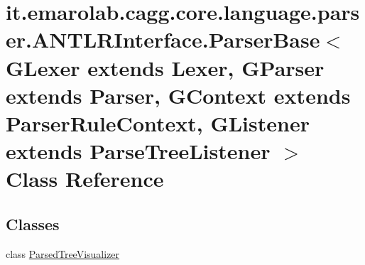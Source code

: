 \hypertarget{classit_1_1emarolab_1_1cagg_1_1core_1_1language_1_1parser_1_1ANTLRInterface_1_1ParserBase_3_01GL50c14717389f32c0d6ed45a3d8ee0386}{\section{it.\-emarolab.\-cagg.\-core.\-language.\-parser.\-A\-N\-T\-L\-R\-Interface.\-Parser\-Base$<$ G\-Lexer extends Lexer, G\-Parser extends Parser, G\-Context extends Parser\-Rule\-Context, G\-Listener extends Parse\-Tree\-Listener $>$ Class Reference}
\label{classit_1_1emarolab_1_1cagg_1_1core_1_1language_1_1parser_1_1ANTLRInterface_1_1ParserBase_3_01GL50c14717389f32c0d6ed45a3d8ee0386}
}
\subsection*{Classes}
\begin{DoxyCompactItemize}
\item 
class \hyperlink{classit_1_1emarolab_1_1cagg_1_1core_1_1language_1_1parser_1_1ANTLRInterface_1_1ParserBase_3_01GL87e2703206e8c51ae32fa157d66066a1}{Parsed\-Tree\-Visualizer}
\end{DoxyCompactItemize}
